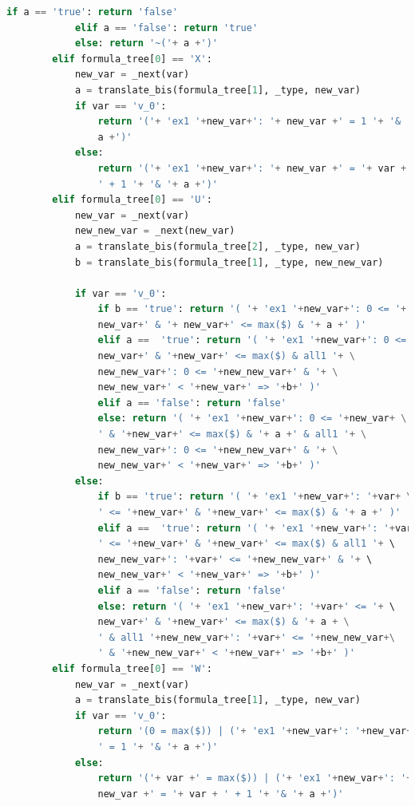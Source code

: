 \begin{lstlisting}[language=Python, style=Python, escapechar = £,  label={code:ltlf2dfa-translate-method}, caption={The \texttt{translate} method.}]
            if a == 'true': return 'false'
            elif a == 'false': return 'true'
            else: return '~('+ a +')'
        elif formula_tree[0] == 'X':
            new_var = _next(var)
            a = translate_bis(formula_tree[1], _type, new_var)
            if var == 'v_0':
                return '('+ 'ex1 '+new_var+': '+ new_var +' = 1 '+ '& '+ \
                a +')'
            else:
                return '('+ 'ex1 '+new_var+': '+ new_var +' = '+ var + \
                ' + 1 '+ '& '+ a +')'
        elif formula_tree[0] == 'U':
            new_var = _next(var)
            new_new_var = _next(new_var)
            a = translate_bis(formula_tree[2], _type, new_var)
            b = translate_bis(formula_tree[1], _type, new_new_var)

            if var == 'v_0':
                if b == 'true': return '( '+ 'ex1 '+new_var+': 0 <= '+ \
                new_var+' & '+ new_var+' <= max($) & '+ a +' )'
                elif a ==  'true': return '( '+ 'ex1 '+new_var+': 0 <= '+ \
                new_var+' & '+new_var+' <= max($) & all1 '+ \
                new_new_var+': 0 <= '+new_new_var+' & '+ \
                new_new_var+' < '+new_var+' => '+b+' )'
                elif a == 'false': return 'false'
                else: return '( '+ 'ex1 '+new_var+': 0 <= '+new_var+ \
                ' & '+new_var+' <= max($) & '+ a +' & all1 '+ \
                new_new_var+': 0 <= '+new_new_var+' & '+ \
                new_new_var+' < '+new_var+' => '+b+' )'
            else:
                if b == 'true': return '( '+ 'ex1 '+new_var+': '+var+ \
                ' <= '+new_var+' & '+new_var+' <= max($) & '+ a +' )'
                elif a ==  'true': return '( '+ 'ex1 '+new_var+': '+var+ \
                ' <= '+new_var+' & '+new_var+' <= max($) & all1 '+ \ 
                new_new_var+': '+var+' <= '+new_new_var+' & '+ \ 
                new_new_var+' < '+new_var+' => '+b+' )'
                elif a == 'false': return 'false'
                else: return '( '+ 'ex1 '+new_var+': '+var+' <= '+ \ 
                new_var+' & '+new_var+' <= max($) & '+ a + \
                ' & all1 '+new_new_var+': '+var+' <= '+new_new_var+\
                ' & '+new_new_var+' < '+new_var+' => '+b+' )'
        elif formula_tree[0] == 'W':
            new_var = _next(var)
            a = translate_bis(formula_tree[1], _type, new_var)
            if var == 'v_0':
                return '(0 = max($)) | ('+ 'ex1 '+new_var+': '+new_var+\
                ' = 1 '+ '& '+ a +')'
            else:
                return '('+ var +' = max($)) | ('+ 'ex1 '+new_var+': '+\
                new_var +' = '+ var + ' + 1 '+ '& '+ a +')'


\end{lstlisting}
